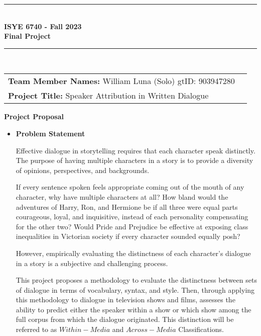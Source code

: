\documentclass{article}
\begin{document}
\begin{titlepage}
	\clearpage\thispagestyle{empty}
	\centering
	\vspace{1cm}
		
	\rule{\linewidth}{1mm} \\[0.5cm]
	{ \Large \bfseries ISYE 6740 - Fall 2023\\[0.2cm]
		Final Project}\\[0.5cm]
	\rule{\linewidth}{1mm} \\[1cm]
	
		\begin{tabular}{l p{5cm}}
		\textbf{Team Member Names:} William Luna (Solo) gtID: 903947280 &   \\[10pt]
		\textbf{Project Title:} Speaker Attribution in Written Dialogue &  \\[10pt]
		\end{tabular} 

        { \Large \bfseries Project Proposal}

        \begin{itemize}
            \item[] \textbf{Problem Statement}
            
			Effective dialogue in storytelling requires that each character speak distinctly.
			The purpose of having multiple characters in a story is to provide a diversity of opinions, perspectives, and backgrounds.
			
			If every sentence spoken feels appropriate coming out of the mouth of any character, why have multiple characters at all?
			How bland would the adventures of Harry, Ron, and Hermione be if all three were equal parts courageous, loyal, and inquisitive, instead of each personality compensating for the other two?
			Would Pride and Prejudice be effective at exposing class inequalities in Victorian society if every character sounded equally posh?

			However, empirically evaluating the distinctness of each character's dialogue in a story is a subjective and challenging process. 

			This project proposes a methodology to evaluate the distinctness between sets of dialogue in terms of vocabulary, syntax, and style.
			Then, through applying this methodology to dialogue in television shows and films, assesses the ability to predict either the speaker within a show or which show among the full corpus from which the dialogue originated.
			This distinction will be referred to as $Within-Media$ and $Across-Media$ Classifications.
			

\end{itemize}
\end{titlepage}
\end{document}
